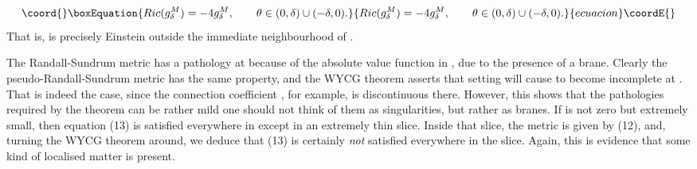 \documentclass[a4paper,12pt]{article}
\providecommand{\abs}[1]{\lvert#1\rvert}
\theoremstyle{definition}
\renewcommand{\u}{\textit}
\renewcommand{\-}{\myHighlight{$\dfrac{\quad\enspace}{\quad}$}\coordHE{}}
\begin{document}
\begin{equation}\coord{}\boxEquation{
Ric(g^M_\delta)=-4g^M_\delta, \qquad \theta\in (0,\delta)\cup(-\delta,0).
}{
Ric(g^M_\delta)=-4g^M_\delta, \qquad \theta\in (0,\delta)\cup(-\delta,0).
}{ecuacion}\coordE{}\end{equation}
That is, \coordHE{} is precisely Einstein outside the immediate neighbourhood of \myHighlight{$\theta=\pi$}\coordHE{}.

The Randall-Sundrum metric has a pathology at \coordHE{} because of the absolute value function \myHighlight{$\abs{x}$}\coordHE{} in \myHighlight{$e^{-2\abs{x}}$}\coordHE{}, due to the presence of a brane. Clearly the pseudo-Randall-Sundrum metric has the same property, and the WYCG theorem asserts that setting \coordHE{} will cause \coordHE{} to become incomplete at \myHighlight{$\delta=\pi$}\coordHE{}. That is indeed the case, since the connection coefficient \myHighlight{$\Gamma^\theta_{\theta\theta}$}\coordHE{}, for example, is discontinuous there. However, this shows that the pathologies required by the theorem can be rather mild \- one should not think of them as singularities, but rather as branes. If \myHighlight{$\delta$}\coordHE{} is not zero but extremely small, then equation (13) is satisfied everywhere in \coordHE{} except in an extremely thin slice. Inside that slice, the metric is given by (12), and, turning the WYCG theorem around, we deduce that (13) is certainly \u{not} satisfied everywhere in the slice. Again, this is evidence that some kind of localised matter is present.
\end{document}
